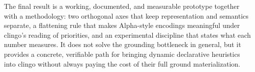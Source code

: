The final result is a working, documented, and measurable prototype together with a methodology: two orthogonal axes that keep representation and semantics separate, a flattening rule that makes Alpha-style encodings meaningful under clingo's reading of priorities, and an experimental discipline that states what each number measures. It does not solve the grounding bottleneck in general, but it provides a concrete, verifiable path for bringing dynamic declarative heuristics into clingo without always paying the cost of their full ground materialization.
